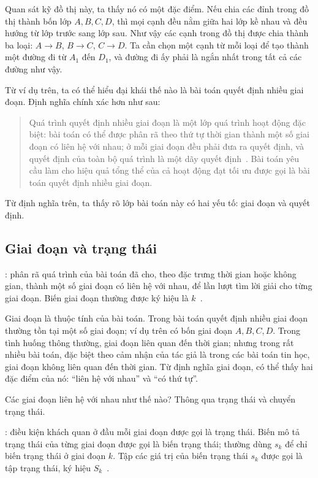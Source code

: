 \documentclass[11pt]{article}
\begin{document}
Quan sát kỹ đồ thị này, ta thấy nó có một đặc điểm. Nếu chia các đỉnh trong
đồ thị thành bốn lớp \(A,B,C,D\), thì mọi cạnh đều nằm giữa hai lớp kề nhau
và đều hướng từ lớp trước sang lớp sau. Như vậy các cạnh trong đồ thị được
chia thành ba loại: \(A\to B\), \(B\to C\), \(C\to D\). Ta cần chọn một cạnh
từ mỗi loại để tạo thành một đường đi từ \(A_1\) đến \(D_1\), và đường đi ấy
phải là ngắn nhất trong tất cả các đường như vậy.

Từ ví dụ trên, ta có thể hiểu đại khái thế nào là bài toán quyết định nhiều
giai đoạn. Định nghĩa chính xác hơn như sau:

\begin{quote}
Quá trình quyết định nhiều giai đoạn là một lớp quá trình hoạt động đặc biệt:
bài toán có thể được phân rã theo thứ tự thời gian thành một số giai đoạn có
liên hệ với nhau; ở mỗi giai đoạn đều phải đưa ra quyết định, và quyết định
của toàn bộ quá trình là một dãy quyết định~\cite{operations}. Bài toán yêu
cầu làm cho hiệu quả tổng thể của cả hoạt động đạt tối ưu được gọi là bài
toán quyết định nhiều giai đoạn.
\end{quote}

Từ định nghĩa trên, ta thấy rõ lớp bài toán này có hai yếu tố: giai đoạn và
quyết định.

\subsection{Giai đoạn và trạng thái}

: phân rã quá trình của bài toán đã cho, theo đặc trưng thời
gian hoặc không gian, thành một số giai đoạn có liên hệ với nhau, để lần lượt
tìm lời giải cho từng giai đoạn. Biến giai đoạn thường được ký hiệu là
\(k\)~\cite{operations}.

Giai đoạn là thuộc tính của bài toán. Trong bài toán quyết định nhiều giai
đoạn thường tồn tại một số giai đoạn; ví dụ trên có bốn giai đoạn \(A,B,C,D\).
Trong tình huống thông thường, giai đoạn liên quan đến thời gian; nhưng trong
rất nhiều bài toán, đặc biệt theo cảm nhận của tác giả là trong các bài toán
tin học, giai đoạn không liên quan đến thời gian. Từ định nghĩa giai đoạn, có
thể thấy hai đặc điểm của nó: ``liên hệ với nhau'' và ``có thứ tự''.

Các giai đoạn liên hệ với nhau như thế nào? Thông qua trạng thái và chuyển
trạng thái.

: điều kiện khách quan ở đầu mỗi giai đoạn được gọi là trạng
thái. Biến mô tả trạng thái của từng giai đoạn được gọi là biến trạng thái;
thường dùng \(s_k\) để chỉ biến trạng thái ở giai đoạn \(k\). Tập các giá trị
của biến trạng thái \(s_k\) được gọi là tập trạng thái, ký hiệu
\(S_k\)~\cite{operations}.
\end{document}
